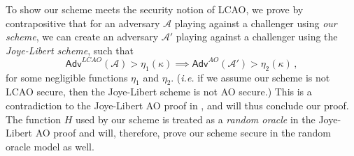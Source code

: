 \documentclass[twocolumn]{autart}
\theoremstyle{definition}
\theoremstyle{remark}
\begin{document}
To show our scheme meets the security notion of LCAO, we prove by contrapositive that for an adversary $\mathcal{A}$ playing against a challenger using \textit{our scheme}, we can create an adversary $\mathcal{A}'$ playing against a challenger using the \textit{Joye-Libert scheme}, such that
\begin{equation*}
    \mathsf{Adv}^{LCAO}(\mathcal{A}) > \eta_1(\kappa) \implies \mathsf{Adv}^{AO}(\mathcal{A}') > \eta_2(\kappa)\,,
\end{equation*}
for some negligible functions $\eta_1$ and $\eta_2$. (\textit{i.e.} if we assume our scheme is not LCAO secure, then the Joye-Libert scheme is not AO secure.) This is a contradiction to the Joye-Libert AO proof in \cite{joyeScalableSchemePrivacyPreserving2013}, and will thus conclude our proof. The function $H$ used by our scheme is treated as a \textit{random oracle} in the Joye-Libert AO proof and will, therefore, prove our scheme secure in the random oracle model as well.
\end{document}

